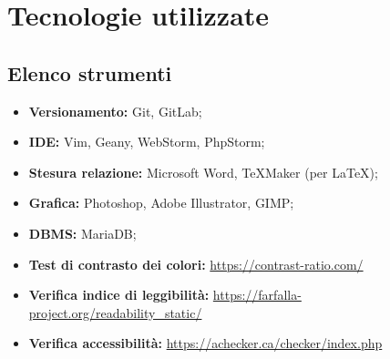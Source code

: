 \section{Tecnologie utilizzate}
	\subsection{Elenco strumenti}
	\begin{itemize}
		\item \textbf{Versionamento:} Git, GitLab;
		\item \textbf{IDE:} Vim, Geany, WebStorm, PhpStorm;
		\item \textbf{Stesura relazione:} Microsoft Word, TeXMaker (per \LaTeX );
		\item \textbf{Grafica:} Photoshop, Adobe Illustrator, GIMP;
		\item \textbf{DBMS:} MariaDB;
		\item \textbf{Test di contrasto dei colori:} \url{https://contrast-ratio.com/}
		\item \textbf{Verifica indice di leggibilità:} \url{https://farfalla-project.org/readability_static/}
		\item \textbf{Verifica accessibilità:} \url{https://achecker.ca/checker/index.php
}
	\end{itemize}
